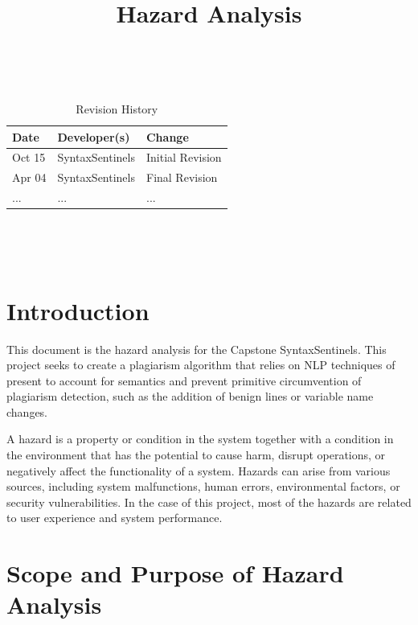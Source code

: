 \documentclass{article}
\title{Hazard Analysis\\\progname}
\author{\authname}
\date{}
\begin{document}
\maketitle
\thispagestyle{empty}

~\newpage


\begin{table}[hp]
\caption*{Revision History} \label{TblRevisionHistory}
\begin{tabularx}{\textwidth}{llX}
\toprule
\textbf{Date} & \textbf{Developer(s)} & \textbf{Change}\\
\midrule
Oct 15 & SyntaxSentinels & Initial Revision\\
Apr 04 & SyntaxSentinels & Final Revision\\
... & ... & ...\\
\bottomrule
\end{tabularx}
\end{table}

~\newpage

\tableofcontents

\listoftables

~\newpage



\section{Introduction}

This document is the hazard analysis for the Capstone SyntaxSentinels. This project seeks to create a plagiarism algorithm that relies on NLP
techniques of present to account for semantics and prevent primitive circumvention of plagiarism detection, such as the addition of benign lines or
variable name changes.

A hazard is a property or condition in the system together with a condition in the environment that has the potential to cause harm, disrupt operations, 
or negatively affect the functionality of a system. Hazards can arise from various sources, including system  malfunctions, human errors, environmental 
factors, or security vulnerabilities. In the case of this project, most of the hazards are related to user experience and system performance.

\section{Scope and Purpose of Hazard Analysis}
\end{document}
